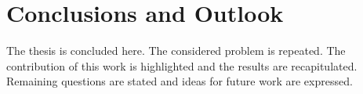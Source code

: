\chapter{Conclusions and Outlook}

The thesis is concluded here. The considered problem is repeated. The contribution of this work is highlighted and the results are recapitulated. Remaining questions are stated and ideas for future work are expressed. 